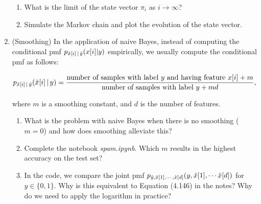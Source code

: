 \documentclass[12pt,twoside]{article}
\begin{document}
\begin{enumerate}
\begin{enumerate}
\item What is the limit of the state vector $\pi_{i}$ as $i \rightarrow \infty$?
\item Simulate the Markov chain and plot the evolution of the state vector. 
\end{enumerate}

\item (Smoothing) In the application of naive Bayes, instead of computing the conditional pmf $p_{\tilde{ x }[i] \, | \, \tilde{ y }}(x[i]|y)$ empirically, we usually compute the conditional pmf as follows:

$$p_{\tilde{ x }[i] \, | \, \tilde{ y }}(\tilde{ x }[i] \, | \, y) = \frac{\text{number of samples with label } y \text{ and having feature } x[i] + m}{\text{number of samples with label } y + md},$$

where $m$ is a smoothing constant, and $d$ is the number of features.

\begin{enumerate}
 \item What is the problem with naive Bayes when there is no smoothing ($m=0$) and how does smoothing alleviate this?
  \item Complete the notebook \textit{spam.ipynb}. Which $m$ results in the highest accuracy on the test set? 
  \item In the code, we compare the joint pmf $p_{\tilde{ y }, \tilde{ x }[1], \cdots, \tilde{ x }[d]}(y, \tilde{ x }[1], \cdots \tilde{ x }[d])$ for $y\in \{0,1\}$. Why is this equivalent to Equation (4.146) in the notes? Why do we need to apply the logarithm in practice?
\end{enumerate}


\end{enumerate}
\end{document}
